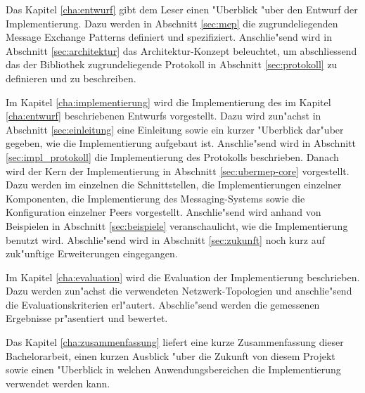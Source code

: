 Das Kapitel \ref{cha:entwurf} gibt dem Leser einen "Uberblick "uber den Entwurf der Implementierung. Dazu werden in Abschnitt \ref{sec:mep} die zugrundeliegenden Message Exchange Patterns definiert und spezifiziert. Anschlie"send wird in Abschnitt \ref{sec:architektur} das Architektur-Konzept beleuchtet, um abschliessend das der Bibliothek zugrundeliegende Protokoll in Abschnitt \ref{sec:protokoll} zu definieren und zu beschreiben.

Im Kapitel \ref{cha:implementierung} wird die Implementierung des im Kapitel \ref{cha:entwurf} beschriebenen Entwurfs vorgestellt. Dazu wird zun"achst in Abschnitt \ref{sec:einleitung} eine Einleitung sowie ein kurzer "Uberblick dar"uber gegeben, wie die Implementierung aufgebaut ist. Anschlie"send wird in Abschnitt \ref{sec:impl_protokoll} die Implementierung des Protokolls beschrieben. Danach wird der Kern der Implementierung in Abschnitt \ref{sec:ubermep-core} vorgestellt. Dazu werden im einzelnen die Schnittstellen, die Implementierungen einzelner Komponenten, die Implementierung des Messaging-Systems sowie die Konfiguration einzelner Peers vorgestellt. Anschlie"send wird anhand von Beispielen in Abschnitt \ref{sec:beispiele} veranschaulicht, wie die Implementierung benutzt wird. Abschlie"send wird in Abschnitt \ref{sec:zukunft} noch kurz auf zuk"unftige Erweiterungen eingegangen.

Im Kapitel \ref{cha:evaluation} wird die Evaluation der Implementierung beschrieben. Dazu werden zun"achst die verwendeten Netzwerk-Topologien und anschlie"send die Evaluationskriterien erl"autert. Abschlie"send werden die gemessenen Ergebnisse pr"asentiert und bewertet.

Das Kapitel \ref{cha:zusammenfassung} liefert eine kurze Zusammenfassung dieser Bachelorarbeit, einen kurzen Ausblick "uber die Zukunft von diesem Projekt sowie einen "Uberblick in welchen Anwendungsbereichen die Implementierung verwendet werden kann.